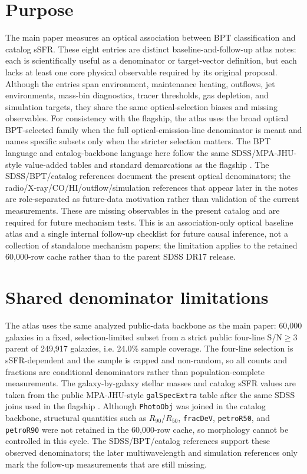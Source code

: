 \documentclass[twocolumn]{aastex631}
\begin{document}

\section{Purpose}
The main paper measures an optical association between BPT classification and catalog sSFR. These eight entries are distinct baseline-and-follow-up atlas notes: each is scientifically useful as a denominator or target-vector definition, but each lacks at least one core physical observable required by its original proposal. Although the entries span environment, maintenance heating, outflows, jet environments, mass-bin diagnostics, tracer thresholds, gas depletion, and simulation targets, they share the same optical-selection biases and missing observables. For consistency with the flagship, the atlas uses the broad optical BPT-selected family when the full optical-emission-line denominator is meant and names specific subsets only when the stricter selection matters. The BPT language and catalog-backbone language here follow the same SDSS/MPA-JHU-style value-added tables and standard demarcations as the flagship \citep{sdssdr17,brinchmann2004,york2000,baldwin1981,kewley2001,kauffmann2003bpt,kewley2006,stasinska2008,stasinska2015}. The SDSS/BPT/catalog references document the present optical denominators; the radio/X-ray/CO/HI/outflow/simulation references that appear later in the notes are role-separated as future-data motivation rather than validation of the current measurements. These are missing observables in the present catalog and are required for future mechanism tests. This is an association-only optical baseline atlas and a single internal follow-up checklist for future causal inference, not a collection of standalone mechanism papers; the limitation applies to the retained 60,000-row cache rather than to the parent SDSS DR17 release.

\section{Shared denominator limitations}
The atlas uses the same analyzed public-data backbone as the main paper: 60,000 galaxies in a fixed, selection-limited subset from a strict public four-line S/N$\geq3$ parent of 249,917 galaxies, i.e. 24.0\% sample coverage. The four-line selection is sSFR-dependent and the sample is capped and non-random, so all counts and fractions are conditional denominators rather than population-complete measurements. The galaxy-by-galaxy stellar masses and catalog sSFR values are taken from the public MPA-JHU-style \texttt{galSpecExtra} table after the same SDSS joins used in the flagship \citep{sdssdr17,brinchmann2004,york2000}. Although \texttt{PhotoObj} was joined in the catalog backbone, structural quantities such as \(R_{90}/R_{50}\), \texttt{fracDeV}, \texttt{petroR50}, and \texttt{petroR90} were not retained in the 60,000-row cache, so morphology cannot be controlled in this cycle. The SDSS/BPT/catalog references support these observed denominators; the later multiwavelength and simulation references only mark the follow-up measurements that are still missing.
\end{document}
